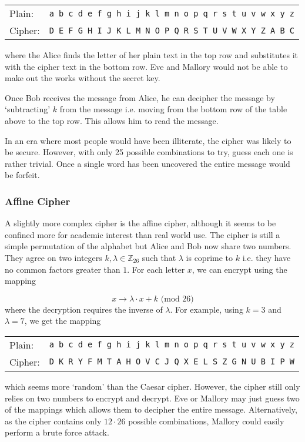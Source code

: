 \begin{center}
\begin{tabular}{l l}%
	Plain:  &\quad\texttt{a b c d e f g h i j k l m n o p q r s t u v w x y z} \\ 
	Cipher: &\quad\texttt{D E F G H I J K L M N O P Q R S T U V W X Y Z A B C} \\
\end{tabular}
\end{center}
where the Alice finds the letter of her plain text in the top row and substitutes it with the cipher text in the bottom row. Eve and Mallory would not be able to make out the works without the secret key. 

Once Bob receives the message from Alice, he can decipher the message by `subtracting' $k$ from the message i.e. moving from the bottom row of the table above to the top row. This allows him to read the message.

In an era where most people would have been illiterate, the cipher was likely to be secure. However, with only 25 possible combinations to try, guess each one is rather trivial. Once a single word has been uncovered the entire message would be forfeit. 

\subsubsection*{Affine Cipher}

A slightly more complex cipher is the affine cipher, although it seems to be confined more for academic interest than real world use. The cipher is still a simple permutation of the alphabet but Alice and Bob now share two numbers. They agree on two integers $k,\lambda\in \mathbb{Z}_{26}$ such that $\lambda$ is coprime to $k$ i.e. they have no common factors greater than $1$. For each letter $x$, we can encrypt using the mapping

\begin{equation}
	x \rightarrow \lambda \cdot x + k \text{ (mod 26)}
\end{equation}
where the decryption requires the inverse of $\lambda$. For example, using $k = 3$ and $\lambda = 7$, we get the mapping

\begin{center}
\begin{tabular}{l l}
	Plain:  &\quad\texttt{a b c d e f g h i j k l m n o p q r s t u v w x y z} \\ 
	Cipher: &\quad\texttt{D K R  Y F M T A H O V C J Q X E L S Z G N U B I P W} \\
\end{tabular}
\end{center}
which seems more `random' than the Caesar cipher. However, the cipher still only relies on two numbers to encrypt and decrypt. Eve or Mallory may just guess two of the mappings which allows them to decipher the entire message. Alternatively, as the cipher contains only $12 \cdot 26$ possible combinations, Mallory could easily perform a brute force attack.

